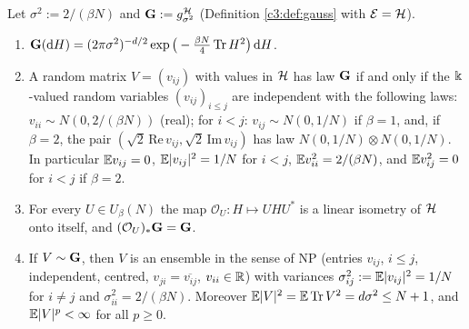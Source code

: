 \begin{auxlemma}\label{c3:GE}
Let $\sigma^2:=2/(\beta N)$ and $\mathbf{G}:=g^{\mathcal{H}}_{\sigma^2}$ (Definition \ref{c3:def:gauss} with $\mathcal E=\mathcal{H}$).
\begin{enumerate}[label=(\roman*),itemsep=1pt]
\item $\mathbf{G}(\mathrm{d} H)=(2\pi\sigma^2)^{-d/2}\exp\big(-\frac{\beta N}{4}\operatorname{Tr} H^2\big)\,\mathrm{d} H$.
\item A random matrix $V=(v_{ij})$ with values in $\mathcal{H}$ has law $\mathbf{G}$ if and only if the $\Bbbk$-valued random variables $(v_{ij})_{i\le j}$ are independent with the following laws:
$v_{ii}\sim N(0,2/(\beta N))$ (real); for $i<j$: $v_{ij}\sim N(0,1/N)$ if $\beta=1$, and, if $\beta=2$, the pair $(\sqrt2\,\mathrm{Re}\,v_{ij},\sqrt2\,\mathrm{Im}\,v_{ij})$ has law $N(0,1/N)\otimes N(0,1/N)$.
In particular $\mathbb{E} v_{ij}=0$, $\mathbb{E}|v_{ij}|^2=1/N$ for $i<j$, $\mathbb{E} v_{ii}^2=2/(\beta N)$, and $\mathbb{E} v_{ij}^2=0$ for $i<j$ if $\beta=2$.
\item For every $U\in U_\beta(N)$ the map $\mathcal O_U:H\mapsto UHU^*$ is a linear isometry of $\mathcal{H}$ onto itself, and $(\mathcal O_U)_*\mathbf{G}=\mathbf{G}$.
\item If $V\sim\mathbf{G}$, then $V$ is an ensemble in the sense of NP (entries $v_{ij}$, $i\le j$, independent, centred, $v_{ji}=\overline{v_{ij}}$, $v_{ii}\in\mathbb{R}$) with variances $\sigma_{ij}^2:=\mathbb{E}|v_{ij}|^2=1/N$ for $i\ne j$ and $\sigma_{ii}^2=2/(\beta N)$. Moreover $\mathbb{E}|V|^2=\mathbb{E}\operatorname{Tr} V^2=d\sigma^2\le N+1$, and $\mathbb{E}|V|^p<\infty$ for all $p\ge0$.
\end{enumerate}
\end{auxlemma}

